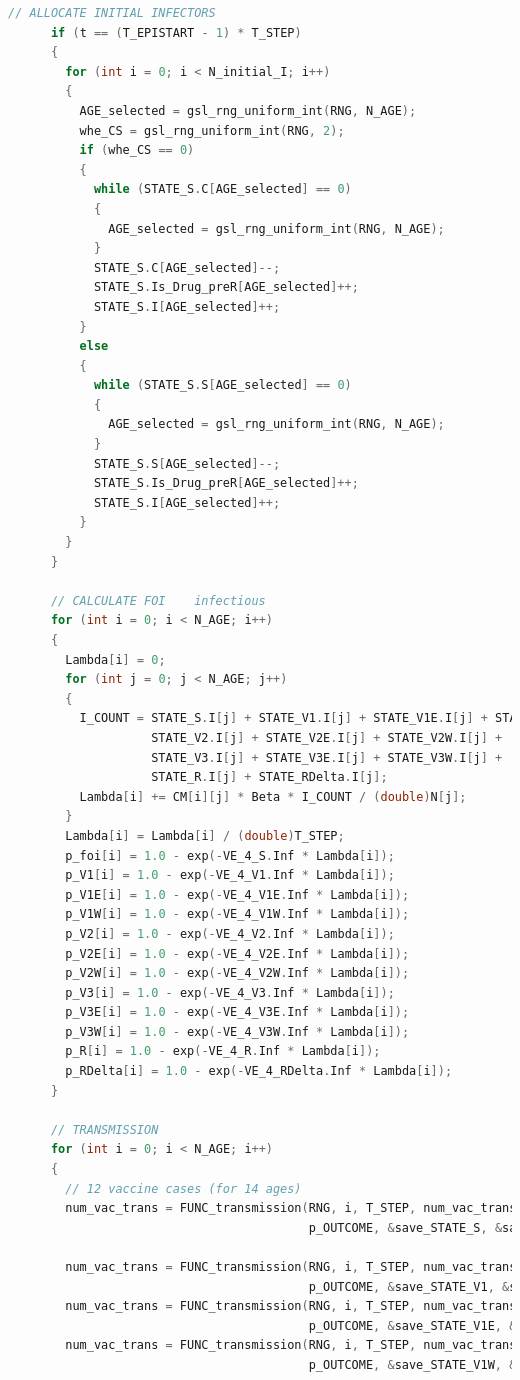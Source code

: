 \documentclass[bwprint]{gmcmthesis}
\numberwithin{figure}{section}
\begin{document}
\begin{lstlisting}[language=C]
      // ALLOCATE INITIAL INFECTORS
      if (t == (T_EPISTART - 1) * T_STEP)
      {
        for (int i = 0; i < N_initial_I; i++)
        {
          AGE_selected = gsl_rng_uniform_int(RNG, N_AGE);
          whe_CS = gsl_rng_uniform_int(RNG, 2);
          if (whe_CS == 0)
          {
            while (STATE_S.C[AGE_selected] == 0)
            {
              AGE_selected = gsl_rng_uniform_int(RNG, N_AGE);
            }
            STATE_S.C[AGE_selected]--;
            STATE_S.Is_Drug_preR[AGE_selected]++;
            STATE_S.I[AGE_selected]++;
          }
          else
          {
            while (STATE_S.S[AGE_selected] == 0)
            {
              AGE_selected = gsl_rng_uniform_int(RNG, N_AGE);
            }
            STATE_S.S[AGE_selected]--;
            STATE_S.Is_Drug_preR[AGE_selected]++;
            STATE_S.I[AGE_selected]++;
          }
        }
      }

      // CALCULATE FOI    infectious
      for (int i = 0; i < N_AGE; i++)
      {
        Lambda[i] = 0;
        for (int j = 0; j < N_AGE; j++)
        {
          I_COUNT = STATE_S.I[j] + STATE_V1.I[j] + STATE_V1E.I[j] + STATE_V1W.I[j] +
                    STATE_V2.I[j] + STATE_V2E.I[j] + STATE_V2W.I[j] +
                    STATE_V3.I[j] + STATE_V3E.I[j] + STATE_V3W.I[j] +
                    STATE_R.I[j] + STATE_RDelta.I[j];
          Lambda[i] += CM[i][j] * Beta * I_COUNT / (double)N[j];
        }
        Lambda[i] = Lambda[i] / (double)T_STEP;
        p_foi[i] = 1.0 - exp(-VE_4_S.Inf * Lambda[i]);
        p_V1[i] = 1.0 - exp(-VE_4_V1.Inf * Lambda[i]);
        p_V1E[i] = 1.0 - exp(-VE_4_V1E.Inf * Lambda[i]);
        p_V1W[i] = 1.0 - exp(-VE_4_V1W.Inf * Lambda[i]);
        p_V2[i] = 1.0 - exp(-VE_4_V2.Inf * Lambda[i]);
        p_V2E[i] = 1.0 - exp(-VE_4_V2E.Inf * Lambda[i]);
        p_V2W[i] = 1.0 - exp(-VE_4_V2W.Inf * Lambda[i]);
        p_V3[i] = 1.0 - exp(-VE_4_V3.Inf * Lambda[i]);
        p_V3E[i] = 1.0 - exp(-VE_4_V3E.Inf * Lambda[i]);
        p_V3W[i] = 1.0 - exp(-VE_4_V3W.Inf * Lambda[i]);
        p_R[i] = 1.0 - exp(-VE_4_R.Inf * Lambda[i]);
        p_RDelta[i] = 1.0 - exp(-VE_4_RDelta.Inf * Lambda[i]);
      }

      // TRANSMISSION
      for (int i = 0; i < N_AGE; i++)
      {
        // 12 vaccine cases (for 14 ages)
        num_vac_trans = FUNC_transmission(RNG, i, T_STEP, num_vac_trans, &STATE_S, VE_4_S, 1, &STATE_R, p_Gamma,
                                          p_OUTCOME, &save_STATE_S, &save_NEW_S, Kappa, p_foi, rate4DRUG, 1, 0);

        num_vac_trans = FUNC_transmission(RNG, i, T_STEP, num_vac_trans, &STATE_V1, VE_4_V1, 0, &STATE_R, p_Gamma,
                                          p_OUTCOME, &save_STATE_V1, &save_NEW_V1, Kappa, p_V1, rate4DRUG, 1, 0);
        num_vac_trans = FUNC_transmission(RNG, i, T_STEP, num_vac_trans, &STATE_V1E, VE_4_V1E, 0, &STATE_R, p_Gamma,
                                          p_OUTCOME, &save_STATE_V1E, &save_NEW_V1E, Kappa, p_V1E, rate4DRUG, 1, 0);
        num_vac_trans = FUNC_transmission(RNG, i, T_STEP, num_vac_trans, &STATE_V1W, VE_4_V1W, 0, &STATE_R, p_Gamma,
                                          p_OUTCOME, &save_STATE_V1W, &save_NEW_V1W, Kappa, p_V1W, rate4DRUG, 1, 0);


\end{lstlisting}
\end{document}
